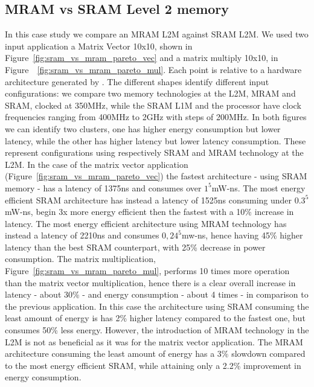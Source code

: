 \subsection{MRAM vs SRAM Level 2 memory}
\label{ssec:case_study2}

In this case study we compare an MRAM L2M against SRAM L2M. We used two input application a Matrix Vector 10x10, shown in Figure~\ref{fig:sram_vs_mram_pareto_vec} and a matrix multiply 10x10, in Figure~~\ref{fig:sram_vs_mram_pareto_mul}. Each point is relative to a hardware architecture generated by \frameworkname. The different shapes identify different input configurations: we compare two memory technologies at the L2M, MRAM and SRAM, clocked at 350MHz, while the SRAM L1M and the processor have clock frequencies ranging from 400MHz to 2GHz with steps of 200MHz. In both figures we can identify two clusters, one has higher energy consumption but lower latency, while the other has higher latency but lower latency consumption. These represent  configurations using respectively SRAM and MRAM technology at the L2M. In the case of the matrix vector application (Figure~\ref{fig:sram_vs_mram_pareto_vec}) the fastest architecture - using SRAM memory - has a latency of 1375ns and consumes over $1^5$mW-ns. The most energy efficient SRAM architecture has instead a latency of 1525ns consuming under $0.3^5$mW-ns, begin 3x more energy efficient then the fastest with a 10\% increase in latency. The most energy efficient architecture using MRAM technology has instead a latency of 2210ns and consumes $0,24^5$mw-ns, hence having 45\% higher latency than the best SRAM counterpart, with 25\% decrease in power consumption. The matrix multiplication, Figure~\ref{fig:sram_vs_mram_pareto_mul}, performs 10 times more operation than the matrix vector multiplication, hence there is a clear overall increase in latency - about 30\% - and energy consumption - about 4 times -  in comparison to the previous application. In this case the architecture using SRAM consuming the least amount of energy is has 2\% higher latency compared to the fastest one, but consumes 50\% less energy. However, the introduction of MRAM technology in the L2M is not as beneficial as it was for the matrix vector application. The MRAM architecture consuming the least amount of energy has a 3\% slowdown compared to the most energy efficient SRAM, while attaining only a 2.2\% improvement in energy consumption. 

